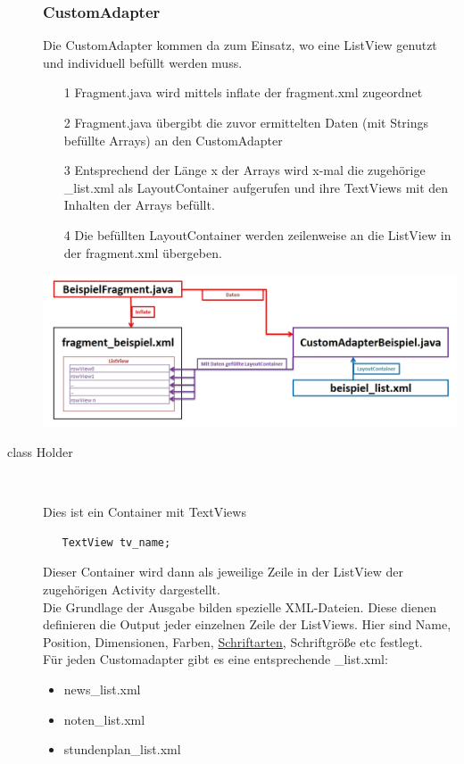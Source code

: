 \begin{description}
\newpage
\subsubsection{CustomAdapter} 
Die CustomAdapter kommen da zum Einsatz, wo eine ListView genutzt und individuell befüllt werden muss. \\
\begin{itemize}
\item[1]Fragment.java wird mittels inflate der fragment.xml zugeordnet
\item[2]Fragment.java übergibt die zuvor ermittelten Daten  (mit Strings befüllte Arrays) an den CustomAdapter
\item[3]Entsprechend der Länge x der Arrays wird x-mal die zugehörige \_list.xml als LayoutContainer aufgerufen und ihre TextViews mit den Inhalten der Arrays befüllt.
\item[4]Die befüllten LayoutContainer werden zeilenweise an die ListView in der fragment.xml übergeben.
\end{itemize}
\item[] \includegraphics[scale=0.5]{05_Handbuch/img/CustomAdapter.jpg} \\

\newpage

\item [class Holder]~\par
Dies ist ein Container mit TextViews
\begin{lstlisting}
   TextView tv_name;
\end{lstlisting}
Dieser Container wird dann als jeweilige Zeile in der ListView der zugehörigen Activity dargestellt.\\
Die Grundlage der Ausgabe bilden spezielle XML-Dateien. Diese dienen definieren die Output jeder einzelnen Zeile der ListViews. Hier sind Name, Position, Dimensionen, Farben, \hyperref[Schriftarten]{Schriftarten}, Schriftgröße etc festlegt.\\ 
Für jeden Customadapter gibt es eine entsprechende \_list.xml:
\begin{itemize}
\item news\_list.xml
\item noten\_list.xml
\item stundenplan\_list.xml
\end{itemize}


\end{description}
